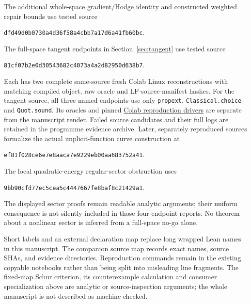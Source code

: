 \documentclass[11pt]{article}
\begin{document}
The additional whole-space gradient/Hodge identity and constructed weighted
repair bounds use tested source
\begin{center}\small\texttt{dfd49d0b0730a4d36f58a4cbb7a17d6a41fb60bc}.\end{center}
The full-space tangent endpoints in Section~\ref{sec:tangent} use tested source
\begin{center}\small\texttt{81cf07b2e0d30543682c4073a4a2d82950d638b7}.\end{center}
Each has two complete same-source fresh Colab Linux reconstructions with
matching compiled object, raw oracle and LF-source-manifest hashes. For the
tangent source, all three named endpoints use only \texttt{propext},
\texttt{Classical.choice} and \texttt{Quot.sound}. Its oracles and pinned
\href{https://github.com/lluiseriksson/THE-ERIKSSON-PROGRAMME/tree/e3bef02c87f4f6ea3392b3ed8fe8b54acb13a264/reproducibility/nonlinear-tangent-20261030}{Colab reproduction drivers}
are separate from the manuscript render. Failed source candidates and their
full logs are retained in the programme evidence archive. Later, separately reproduced sources formalize the actual implicit-function
curve construction at
\begin{center}\small\texttt{ef81f028ce6e7e8aaca7e9229eb00aa683752a41}.\end{center}
The local quadratic-energy regular-sector obstruction uses
\begin{center}\small\texttt{9bb90cfd77ec5cea5c4447667fe8baf8c21429a1}.\end{center}
The displayed sector proofs remain readable analytic arguments; their
uniform consequence is not silently included in those four-endpoint reports.
No theorem about a nonlinear sector is inferred from a full-space no-go alone.

Short labels and an external declaration map replace long wrapped Lean names
in this manuscript. The companion source map records exact names, source SHAs,
and evidence directories. Reproduction commands remain in the existing
copyable notebooks rather than being split into misleading line fragments.
The fixed-map Schur criterion, its counterexample calculation and consumer
specialization above are analytic or source-inspection arguments; the whole
manuscript is not described as machine checked.
\end{document}
